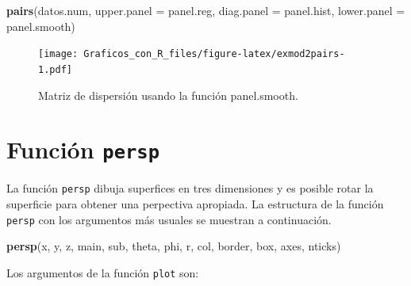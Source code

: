 \documentclass[10pt,]{krantz}
\makeatletter
\newenvironment{Shaded}{\begin{snugshade}}{\end{snugshade}}
\newcommand{\KeywordTok}[1]{\textcolor[rgb]{0.13,0.29,0.53}{\textbf{{#1}}}}
\newcommand{\DataTypeTok}[1]{\textcolor[rgb]{0.13,0.29,0.53}{{#1}}}
\newcommand{\NormalTok}[1]{{#1}}
\newenvironment{kframe}{%
\medskip{}
\setlength{\fboxsep}{.8em}
 \def\at@end@of@kframe{}%
 \ifinner\ifhmode%
  \def\at@end@of@kframe{\end{minipage}}%
  \begin{minipage}{\columnwidth}%
 \fi\fi%
 \def\FrameCommand##1{\hskip\@totalleftmargin \hskip-\fboxsep
 \colorbox{shadecolor}{##1}\hskip-\fboxsep
     \hskip-\linewidth \hskip-\@totalleftmargin \hskip\columnwidth}%
 \MakeFramed {\advance\hsize-\width
   \@totalleftmargin\z@ \linewidth\hsize
   \@setminipage}}%
 {\par\unskip\endMakeFramed%
 \at@end@of@kframe}
\renewenvironment{Shaded}{\begin{kframe}}{\end{kframe}}
\makeatother
\begin{document}
\begin{Shaded}
\begin{Highlighting}[]
\KeywordTok{pairs}\NormalTok{(datos.num,}
      \DataTypeTok{upper.panel =} \NormalTok{panel.reg,}
      \DataTypeTok{diag.panel =} \NormalTok{panel.hist,}
      \DataTypeTok{lower.panel =} \NormalTok{panel.smooth)}
\end{Highlighting}
\end{Shaded}

\begin{figure}[htbp]
\centering
\texttt{[image: Graficos\_con\_R\_files/figure-latex/exmod2pairs-1.pdf]}
\caption{\label{fig:exmod2pairs}Matriz de dispersión usando la función
panel.smooth.}
\end{figure}

\section{\texorpdfstring{Función \texttt{persp}
}{Función persp }}\label{funcion-persp}

La función \texttt{persp} dibuja superfices en tres dimensiones y es
posible rotar la superficie para obtener una perpectiva apropiada. La
estructura de la función \texttt{persp} con los argumentos más usuales
se muestran a continuación.

\begin{Shaded}
\begin{Highlighting}[]
\KeywordTok{persp}\NormalTok{(x, y, z, main, sub, theta, phi, r, col,}
      \NormalTok{border, box, axes, nticks)}
\end{Highlighting}
\end{Shaded}

Los argumentos de la función \texttt{plot} son:
\end{document}
